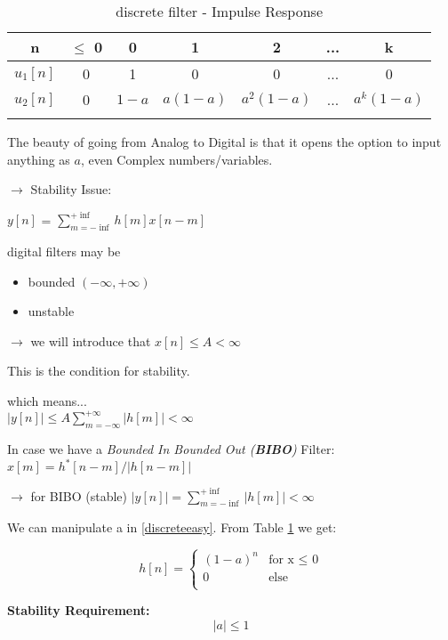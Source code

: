 \begin{table}
	\caption{discrete filter - Impulse Response }	
	\label{tab:prog_filter_Impulse_Resp}
	\centering
\begin{tabular}[H]{|c|cccccc|}
\hline
	n & $\leq$ 0 & 0 &1 &2 & ... &k\\
	\hline
	$u_1[n]$& 0 & 1 & 0 & 0 & ... &0\\
	$u_2[n]$& 0 & $1-a$ & $a(1-a)$&$ a^2(1-a) $& ... & $a^k (1-a)$\\
	\hline
	\label{wertetabelle}
\end{tabular}
\end{table}

The beauty of going from Analog to Digital is that it opens the option to input anything as $a$, even Complex numbers/variables. 

$\rightarrow$ Stability Issue: 

$y[n]$ = $\sum_{m=-\inf}^{+\inf}h[m]x[n-m]$

digital filters may be 
\begin{itemize} 
	\item bounded $(-\infty, +\infty)$
	\item unstable 
\end{itemize}


$\rightarrow$ we will introduce that 	$x[n] \leq A < \infty$

This is the condition for stability.

which means...\\

$|y[n]| \leq A \sum_{m=-\infty}^{+\infty} | h[m] | < \infty $


In case we have a \textit{Bounded In Bounded Out (\textbf{BIBO})} Filter: 
$x[m] = h^{*}[n-m] / |h[n-m]|$

$\rightarrow$ for BIBO (stable) $|y[n]| = \sum_{m=-\inf}^{+\inf}|h[m]| < \infty$

We can manipulate a in \ref{discreteeasy}. From Table \ref{wertetabelle} we get:

\begin{equation}
 h[n] = \begin{cases}
       (1 - a)^n &  \text{for x $\leq$ 0} \\
       0 & \text{else} \\
     \end{cases}
\end{equation}


\textbf{Stability Requirement:} 
\begin{equation}
\boxed{|a| \leq 1}
\end{equation}

